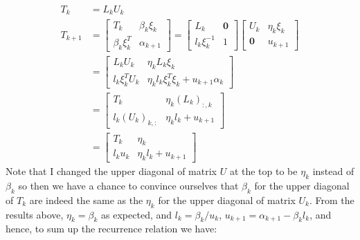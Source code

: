 \documentclass[]{article}
\theoremstyle{definition}
\begin{document}
            \begin{align}
                T_k &= L_kU_k
                \\
                T_{k + 1} &= \begin{bmatrix}
                    T_k & \beta_k \xi_k \\
                    \beta_k \xi^T_k & \alpha_{k + 1}
                \end{bmatrix} = 
                \begin{bmatrix}
                    L_k & \mathbf{0} \\ l_k \xi_k^{-1} & 1
                \end{bmatrix}
                \begin{bmatrix}
                    U_k & \eta_k \xi_k \\
                    \mathbf{0} & u_{k + 1}
                \end{bmatrix}
                \\
                &= 
                \begin{bmatrix}
                    L_kU_k & \eta_k L_k \xi_k 
                    \\
                    l_k \xi_k^TU_k & \eta_k l_k \xi_k^T \xi_k + u_{k + 1}\alpha_k
                \end{bmatrix}
                \\
                &= 
                \begin{bmatrix}
                    T_k & \eta_k (L_k)_{:, k} \\ 
                    l_k(U_k)_{k, :} & \eta_k l_k + u_{k + 1}
                \end{bmatrix}
                \\
                &= 
                \begin{bmatrix}
                    T_k & \eta_k \\
                    l_k u_k & \eta_k l_k + u_{k + 1}
                \end{bmatrix}
            \end{align}
            Note that I changed the upper diagonal of matrix $U$ at the top to be $\eta_k$ instead of $\beta_k$ so then we have a chance to convince ourselves that $\beta_k$ for the upper diagonal of $T_k$ are indeed the same as the $\eta_k$ for the upper diagonal of matrix $U_k$. From the results above, $\eta_k = \beta_k$ as expected, and $l_k = \beta_k/u_k$, $u_{k + 1} = \alpha_{k +1} - \beta_{k}l_k$, and hence, to sum up the recurrence relation we have: 
\end{document}
